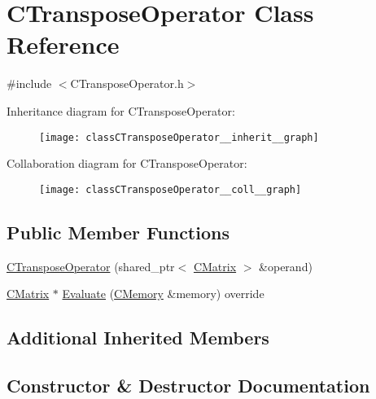 \hypertarget{classCTransposeOperator}{}\section{C\+Transpose\+Operator Class Reference}
\label{classCTransposeOperator}


{\ttfamily \#include $<$C\+Transpose\+Operator.\+h$>$}



Inheritance diagram for C\+Transpose\+Operator\+:\nopagebreak
\begin{figure}[H]
\begin{center}
\leavevmode
\texttt{[image: classCTransposeOperator\_\_inherit\_\_graph]}
\end{center}
\end{figure}


Collaboration diagram for C\+Transpose\+Operator\+:\nopagebreak
\begin{figure}[H]
\begin{center}
\leavevmode
\texttt{[image: classCTransposeOperator\_\_coll\_\_graph]}
\end{center}
\end{figure}
\subsection*{Public Member Functions}
\begin{DoxyCompactItemize}
\item 
\hyperlink{classCTransposeOperator_a87ad1b84abb5e03b679d83f18d85b5ff}{C\+Transpose\+Operator} (shared\+\_\+ptr$<$ \hyperlink{classCMatrix}{C\+Matrix} $>$ \&operand)
\item 
\hyperlink{classCMatrix}{C\+Matrix} $\ast$ \hyperlink{classCTransposeOperator_a1010970978708b06a659237afb88c043}{Evaluate} (\hyperlink{classCMemory}{C\+Memory} \&memory) override
\end{DoxyCompactItemize}
\subsection*{Additional Inherited Members}


\subsection{Constructor \& Destructor Documentation}

